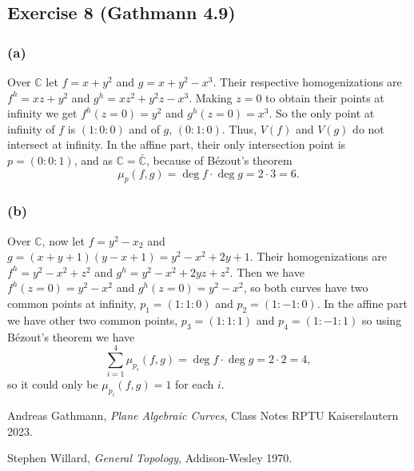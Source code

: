 \documentclass[11pt,a4paper]{article}
\begin{document}
\subsection*{Exercise 8 (Gathmann 4.9)}

\subsubsection*{(a)}
Over $ \mathbb C $ let $ f = x + y^2 $ and $ g = x + y^2 - x^3 $. Their respective homogenizations are $ f^{h} = xz +y^2 $ and $ g^{h} = xz^2 + y^2z - x^3 $. Making $ z = 0 $ to obtain their points at infinity we get $ f^{h}(z=0) = y^2 $ and $ g^{h}(z=0) = x^3 $. So the only point at infinity of $ f $ is $ (1:0:0) $ and of $ g $, $ (0:1:0) $. Thus, $ V(f) $ and $ V(g) $ do not intersect at infinity. In the affine part, their only intersection point is $ p = (0:0:1) $, and as $ \mathbb C = \bar{\mathbb C}$, because of Bézout's theorem
$$
  \mu_p(f, g) = \deg f \cdot \deg g = 2 \cdot 3 = 6.
$$

\subsubsection*{(b)}
Over $ \mathbb C $, now let $ f = y^2 - x_2 $ and $ g = (x + y + 1) (y - x + 1) = y^2 - x^2 + 2y + 1 $. Their homogenizations are $ f^h = y^2 - x^2 + z^2 $ and $ g^h = y^2 - x^2 + 2yz + z^2 $. Then we have $ f^h(z=0) = y^2 - x^2 $ and $ g^h(z=0) = y^2 - x^2 $, so both curves have two common points at infinity, $ p_1 = (1:1:0) $ and $ p_2 = (1:-1:0) $. In the affine part we have other two common points, $ p_3 = (1:1:1) $ and $ p_4 = (1:-1:1) $ so using Bézout's theorem we have
$$
  \sum_{i=1}^{4} \mu_{p_i}(f, g) = \deg f \cdot \deg g = 2 \cdot 2 = 4,
$$
so it could only be $ \mu_{p_i}(f, g) = 1 $ for each $ i $.

\begin{thebibliography}{9}

  Andreas Gathmann,
  \textit{Plane Algebraic Curves},
  Class Notes RPTU Kaiserslautern 2023.

  Stephen Willard,
  \textit{General Topology},
  Addison-Wesley 1970.
  
\end{thebibliography}
\end{document}
